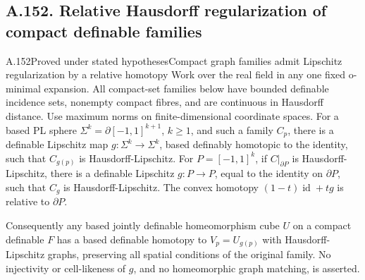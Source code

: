 \subsection{A.152. Relative Hausdorff regularization of compact definable families}

\begin{saresult}{A.152}{Proved under stated hypotheses}{Compact graph families admit Lipschitz regularization by a relative homotopy}
Work over the real field in any one fixed o-minimal expansion.
All compact-set families below have bounded definable incidence sets,
nonempty compact fibres, and are continuous in Hausdorff distance.
Use maximum norms on finite-dimensional coordinate spaces.
For a based PL sphere \(\Sigma^k=\partial[-1,1]^{k+1}\), \(k\ge1\),
and such a family \(C_p\), there is a definable Lipschitz map
\(g:\Sigma^k\to\Sigma^k\), based definably homotopic to the identity,
such that \(C_{g(p)}\) is Hausdorff-Lipschitz.
For \(P=[-1,1]^k\), if \(C|_{\partial P}\) is Hausdorff-Lipschitz,
there is a definable Lipschitz \(g:P\to P\), equal to the identity on
\(\partial P\), such that \(C_g\) is Hausdorff-Lipschitz.
The convex homotopy \((1-t)\operatorname{id}+tg\) is relative to
\(\partial P\).

Consequently any based jointly definable homeomorphism cube \(U\)
on a compact definable \(F\) has a based definable homotopy to
\(V_p=U_{g(p)}\) with Hausdorff-Lipschitz graphs, preserving all
spatial conditions of the original family.
No injectivity or cell-likeness of \(g\), and no homeomorphic
graph matching, is asserted.
\end{saresult}

